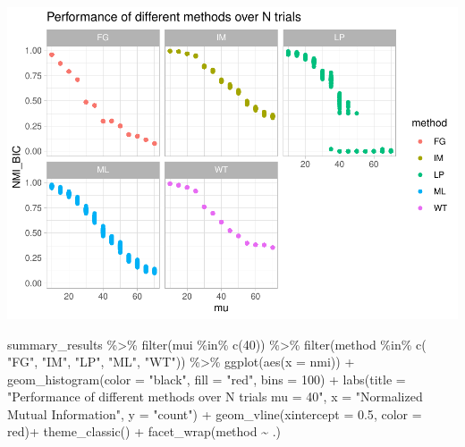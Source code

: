 \documentclass[
]{article}
\newenvironment{Shaded}{\begin{snugshade}}{\end{snugshade}}
\newcommand{\AttributeTok}[1]{\textcolor[rgb]{0.77,0.63,0.00}{#1}}
\newcommand{\DecValTok}[1]{\textcolor[rgb]{0.00,0.00,0.81}{#1}}
\newcommand{\FloatTok}[1]{\textcolor[rgb]{0.00,0.00,0.81}{#1}}
\newcommand{\FunctionTok}[1]{\textcolor[rgb]{0.00,0.00,0.00}{#1}}
\newcommand{\NormalTok}[1]{#1}
\newcommand{\SpecialCharTok}[1]{\textcolor[rgb]{0.00,0.00,0.00}{#1}}
\newcommand{\StringTok}[1]{\textcolor[rgb]{0.31,0.60,0.02}{#1}}
\begin{document}
\includegraphics{com_det_algorithms_files/figure-latex/unnamed-chunk-12-1.pdf}

\begin{Shaded}
\begin{Highlighting}[]
\NormalTok{summary\_results }\SpecialCharTok{\%\textgreater{}\%} 
  \FunctionTok{filter}\NormalTok{(mui }\SpecialCharTok{\%in\%} \FunctionTok{c}\NormalTok{(}\DecValTok{40}\NormalTok{)) }\SpecialCharTok{\%\textgreater{}\%}
  \FunctionTok{filter}\NormalTok{(method }\SpecialCharTok{\%in\%} \FunctionTok{c}\NormalTok{( }\StringTok{"FG"}\NormalTok{, }\StringTok{"IM"}\NormalTok{, }\StringTok{"LP"}\NormalTok{, }\StringTok{"ML"}\NormalTok{, }\StringTok{"WT"}\NormalTok{)) }\SpecialCharTok{\%\textgreater{}\%}
    \FunctionTok{ggplot}\NormalTok{(}\FunctionTok{aes}\NormalTok{(}\AttributeTok{x =}\NormalTok{ nmi)) }\SpecialCharTok{+}
    \FunctionTok{geom\_histogram}\NormalTok{(}\AttributeTok{color =} \StringTok{"black"}\NormalTok{, }\AttributeTok{fill =} \StringTok{"red"}\NormalTok{, }\AttributeTok{bins =} \DecValTok{100}\NormalTok{) }\SpecialCharTok{+}
    \FunctionTok{labs}\NormalTok{(}\AttributeTok{title =} \StringTok{"Performance of different methods over N trials mu = 40"}\NormalTok{, }\AttributeTok{x =} \StringTok{"Normalized Mutual Information"}\NormalTok{, }\AttributeTok{y =} \StringTok{"count"}\NormalTok{) }\SpecialCharTok{+}
    \FunctionTok{geom\_vline}\NormalTok{(}\AttributeTok{xintercept =} \FloatTok{0.5}\NormalTok{, }\AttributeTok{color =} \StringTok{\textquotesingle{}red\textquotesingle{}}\NormalTok{)}\SpecialCharTok{+}
    \FunctionTok{theme\_classic}\NormalTok{() }\SpecialCharTok{+} 
    \FunctionTok{facet\_wrap}\NormalTok{(method }\SpecialCharTok{\textasciitilde{}}\NormalTok{ .)}
\end{Highlighting}
\end{Shaded}
\end{document}
